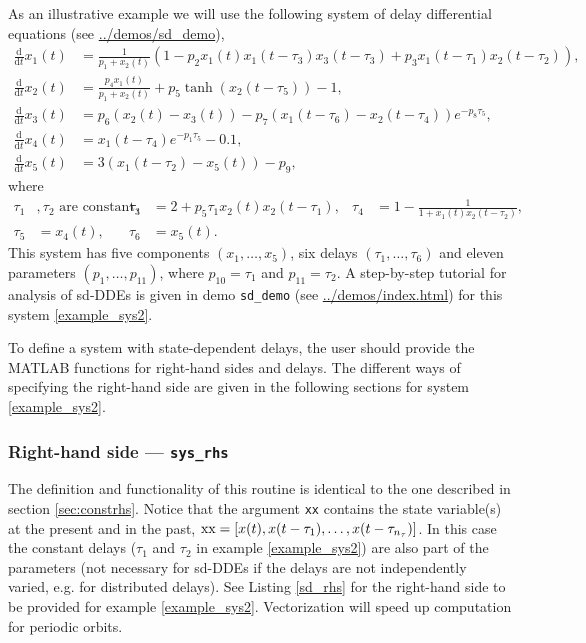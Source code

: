 \documentclass[10pt]{scrartcl}
\newcommand{\demobase}{\url{../demos/index.html}}
\renewcommand{\d}{\mathrm{d}}
\newcommand{\blist}[1]{\mbox{\lstinline!#1!}}
\begin{document}
As an illustrative example we will use the following system of delay 
differential equations (see \url{../demos/sd_demo}),
\begin{equation}\label{example_sys2}
  \begin{split}
    \frac{\d}{\d t}x_1(t)&=\frac{1}{p_1+x_2(t)}\left(1-p_2x_1(t)x_1(t-\tau_3)
      x_3(t-\tau_3)+p_3x_1(t-\tau_1)x_2(t-\tau_2)\right),\\
    \frac{\d}{\d t}x_2(t)&=\frac{p_4 x_1(t)}{p_1+x_2(t)}+
    p_5\tanh(x_2(t-\tau_5))-1,\\
    \frac{\d}{\d t}x_3(t)&=p_6(x_2(t)-x_3(t))-p_7(x_1(t-\tau_6)-x_2(t-\tau_4))e^{-p_8 \tau_5},\\
    \frac{\d}{\d t}x_4(t)&=x_1(t-\tau_4)e^{-p_1 \tau_5} -0.1,\\
    \frac{\d}{\d t}x_5(t)&=3(x_1(t-\tau_2)-x_5(t))-p_9,
  \end{split}
\end{equation}
where
\begin{align*}
\tau_1&, \tau_2 \mbox{\ are constant delays},&
\tau_3&=2+p_5\tau_1x_2(t)x_2(t-\tau_1),&
\tau_4&=1-\frac{1}{1+x_1(t)x_2(t-\tau_2)},\\
\tau_5&=x_4(t),&
\tau_6&=x_5(t).
\end{align*}
This system has five components $(x_1,\ldots,x_5)$, six delays
$(\tau_1,\ldots,\tau_6)$ and eleven parameters $(p_1,\ldots,p_{11})$,
where $p_{10}=\tau_1$ and $p_{11}=\tau_2$. A step-by-step tutorial
for analysis of sd-DDEs is given in demo \texttt{sd\_demo} (see
\demobase{}) for this system \eqref{example_sys2}.

To define a system with state-dependent delays, the user should
provide the MATLAB functions for right-hand sides and delays. The
different ways of specifying the right-hand side are given in the
following sections for system \eqref{example_sys2}.


\subsubsection{Right-hand side --- \texorpdfstring{\blist{sys_rhs}}{sys\_rhs}}
\label{sec:sdrhs}
The definition and functionality of this routine is identical to the
one described in section \ref{sec:constrhs}.  Notice that the argument
\blist{xx} contains the state variable(s) at the present and in the
past, $\blist{xx}=[x(t), x(t-\tau_1), \ldots,x(t-\tau_{n_\tau})]$.  In
this case the constant delays ($\tau_1$ and $\tau_2$ in example
\eqref{example_sys2}) are also part of the parameters (not necessary for sd-DDEs if the delays are not independently varied, e.g. for distributed delays). See Listing
\ref{sd_rhs} for the right-hand side to be provided for example
\eqref{example_sys2}. Vectorization will speed up computation for
periodic orbits.  
\end{document}
